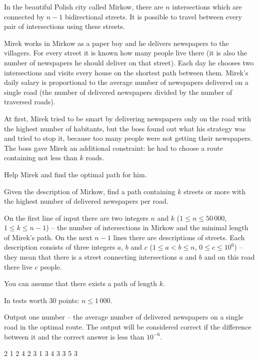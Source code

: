 





In the beautiful Polish city called Mirkow, there are $n$ intersections which are connected by $n - 1$ bidirectional streets.
It is possible to travel between every pair of intersections using these streets.

Mirek works in Mirkow as a paper boy and he delivers newspapers to the villagers.
For every street it is known how many people live there
	(it is also the number of newspapers he should deliver on that street).
Each day he chooses two intersections and visits every house on the shortest path between them.
Mirek's daily salary is proportional to the average number of newspapers delivered on a single road
	(the number of delivered newspapers divided by the number of traversed roads).

At first, Mirek tried to be smart by delivering newspapers only on the road with the highest number of habitants,
	but the boss found out what his strategy was and tried to stop it, because too many people were not getting their newspapers.
The boss gave Mirek an additional constraint: he had to choose a route containing not less than $k$ roads.

Help Mirek and find the optimal path for him.


Given the description of Mirkow, find a path containing $k$ streets or more
	with the highest number of delivered newspapers per road.


On the first line of input there are two integers $n$ and $k$ ($1 \le n \le 50\,000$, $1 \le k \le n - 1$)
	-- the number of intersections in Mirkow and the minimal length of Mirek's path.
On the next $n-1$ lines there are descriptions of streets.
Each description consists of three integers $a$, $b$ and $c$ ($1 \le a < b \le n$, $0 \le c \le 10^6$)
	-- they mean that there is a street connecting intersections $a$ and $b$ and on this road there live $c$ people.

You can assume that there exists a path of length $k$.

In tests worth $30$ points: $n \le 1\,000$.


Output one number -- the average number of delivered newspapers on a single road in the optimal route.
The output will be considered correct if the difference between it and the correct answer is less than $10^{-6}$.


 2
1 2 4
2 3 1
3 4 3
3 5 3
\sampleEND


